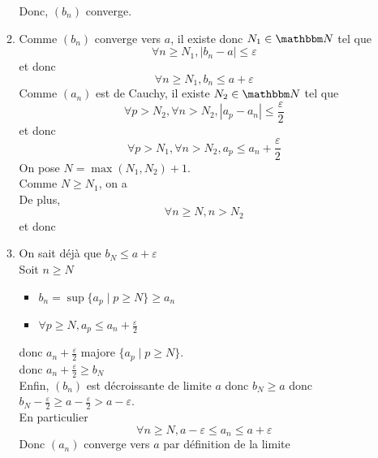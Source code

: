 \begin{enumerate}
\begin{enumerate}
				Donc, $(b_n)$ converge.
			\item
				Comme $(b_n)$ converge vers $a$, il existe donc $N_1 \in \N$ tel que \[
					\forall n \ge N_1, \left| b_n - a \right| \le \varepsilon
				\] et donc \[
				\forall n \ge N_1, b_n \le a + \varepsilon
				\]
				Comme $(a_n)$ est de Cauchy, il existe $N_2 \in \N$ tel que \[
					\forall p > N_2, \forall n > N_2, \left| a_p - a_n \right| \le \frac{\varepsilon}{2}
				\] et donc \[
				\forall p > N_1, \forall n > N_2, a_p \le a_n + \frac{\varepsilon}{2}
				\] On pose $N = \max(N_1, N_2) + 1$.\\
				Comme $N \ge N_1$, on a \\
				De plus, \[
					\forall n \ge N, n > N_2
				\] et donc 
			\item On sait déjà que $b_N \le  a + \varepsilon$ \\
				Soit $n \ge N$ 
				\begin{itemize}
					\item $b_n = \sup \{a_p  \mid p \ge N\} \ge a_n$ 
					\item $\forall p \ge N, a_p \le a_n + \frac{\varepsilon}{2}$
				\end{itemize}
				donc $a_n + \frac{\varepsilon}{2}$ majore $\{a_p  \mid p \ge N\}$.\\
				donc $a_n + \frac{\varepsilon}{2} \ge  b_N$ \\

				Enfin, $(b_n)$ est décroissante de limite $a$ donc $b_N \ge a$ donc $b_N - \frac{\varepsilon}{2} \ge a - \frac{\varepsilon}{2} > a- \varepsilon$.\\
				En particulier \[
					\forall n \ge N, a - \varepsilon \le a_n \le a+\varepsilon
				\] Donc $(a_n)$ converge vers $a$ par définition de la limite
		\end{enumerate}
\end{enumerate}

